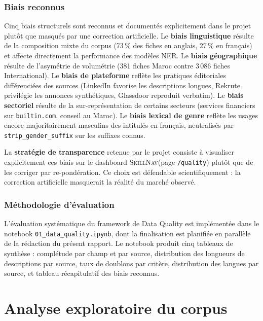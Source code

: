 \documentclass[11pt,a4paper,openany]{report}
\newcommand{\skillnav}{\textsc{SkillNav}\xspace}
\begin{document}
\subsection{Biais reconnus}

Cinq biais structurels sont reconnus et document\'es explicitement dans le projet plut\^ot que masqu\'es par une correction artificielle. Le \textbf{biais linguistique} r\'esulte de la composition mixte du corpus (73\,\% des fiches en anglais, 27\,\% en fran\c{c}ais) et affecte directement la performance des mod\`eles NER. Le \textbf{biais g\'eographique} r\'esulte de l'asym\'etrie de volum\'etrie (381 fiches Maroc contre 3\,086 fiches International). Le \textbf{biais de plateforme} refl\`ete les pratiques \'editoriales diff\'erenci\'ees des sources (LinkedIn favorise les descriptions longues, Rekrute privil\'egie les annonces synth\'etiques, Glassdoor reproduit verbatim). Le \textbf{biais sectoriel} r\'esulte de la sur-repr\'esentation de certains secteurs (services financiers sur \texttt{builtin.com}, conseil au Maroc). Le \textbf{biais lexical de genre} refl\`ete les usages encore majoritairement masculins des intitul\'es en fran\c{c}ais, neutralis\'es par \texttt{strip\_gender\_suffix} sur les suffixes connus.

La \textbf{strat\'egie de transparence} retenue par le projet consiste \`a visualiser explicitement ces biais sur le dashboard \skillnav (page \texttt{/quality}) plut\^ot que de les corriger par re-pond\'eration. Ce choix est d\'efendable scientifiquement : la correction artificielle masquerait la r\'ealit\'e du march\'e observ\'e.

\subsection{M\'ethodologie d'\'evaluation}

L'\'evaluation syst\'ematique du framework de Data Quality est impl\'ement\'ee dans le notebook \texttt{01\_data\_quality.ipynb}, dont la finalisation est planifi\'ee en parall\`ele de la r\'edaction du pr\'esent rapport. Le notebook produit cinq tableaux de synth\`ese : compl\'etude par champ et par source, distribution des longueurs de descriptions par source, taux de doublons par crit\`ere, distribution des langues par source, et tableau r\'ecapitulatif des biais reconnus.

\chapter{Analyse exploratoire du corpus}
\end{document}
